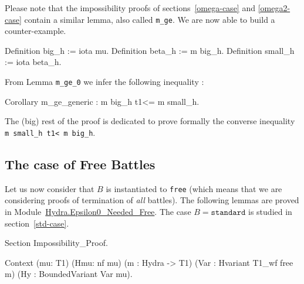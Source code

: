 Please note that the impossibility proofs of 
sections~\vref{omega-case} and \vref{omega2-case} contain a similar lemma, also called \texttt{m\_ge}.
We are now able to build a counter-example.

\begin{Coqsrc}
  Definition big_h := iota mu.
  Definition beta_h := m big_h.
  Definition small_h := iota beta_h.
\end{Coqsrc}
  
From Lemma \texttt{m\_ge\_0} we infer the following inequality :

\begin{Coqsrc}
    Corollary m_ge_generic : m big_h t1<= m small_h.
 \end{Coqsrc}

The (big) rest of the proof is dedicated to prove formally the converse inequality 
\texttt{m small\_h t1< m big\_h}. 



\subsection{The case of Free Battles}
\label{sec:free-battles-case}
Let us now consider that $B$ is instantiated to \texttt{free} (which means that we are considering proofs of termination of \emph{all} battles). The following lemmas are proved in Module~\href{../theories/html/hydras.Hydra.Epsilon0_Needed_Free.html}{Hydra.Epsilon0\_Needed\_Free}.
The case $B=\texttt{standard}$ is studied in section~\vref{std-case}.



\begin{Coqsrc}
Section Impossibility_Proof.

  Context (mu: T1)
          (Hmu: nf mu)
          (m : Hydra -> T1)
          (Var : Hvariant  T1_wf free m)
          (Hy : BoundedVariant Var mu).
  \end{Coqsrc}


